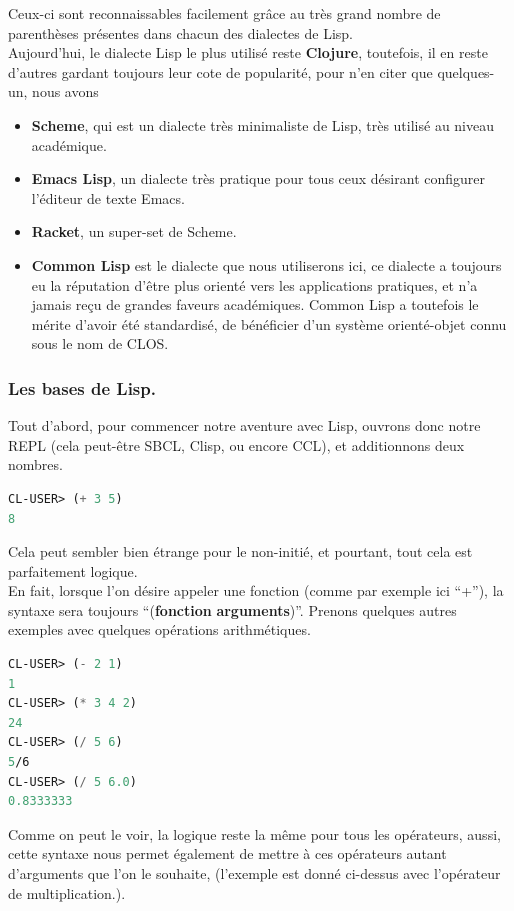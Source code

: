 \documentclass[a4paper, 12pt]{article}
\numberwithin{equation}{subsection}
\begin{document}
Ceux-ci sont reconnaissables facilement grâce au très grand nombre de parenthèses présentes dans chacun des dialectes de Lisp. \\

Aujourd'hui, le dialecte Lisp le plus utilisé reste {\bf Clojure}, toutefois, il en reste d'autres gardant toujours leur cote de popularité, pour n'en citer que quelques-un, nous avons
\begin{itemize}
  \item {\bf Scheme}, qui est un dialecte très minimaliste de Lisp, très utilisé au niveau académique.
  \item {\bf Emacs Lisp}, un dialecte très pratique pour tous ceux désirant configurer l'éditeur de texte Emacs.
  \item {\bf Racket}, un super-set de Scheme.
  \item {\bf Common Lisp} est le dialecte que nous utiliserons ici, ce dialecte a toujours eu la réputation d'être plus orienté vers les applications pratiques, et n'a jamais reçu de grandes faveurs académiques. Common Lisp a toutefois le mérite d'avoir été standardisé, de bénéficier d'un système orienté-objet connu sous le nom de CLOS.
\end{itemize}
\subsubsection{Les bases de Lisp.}
Tout d'abord, pour commencer notre aventure avec Lisp, ouvrons donc notre REPL (cela peut-être SBCL, Clisp, ou encore CCL), et additionnons deux nombres. \\
\begin{lstlisting}[language=Lisp]
CL-USER> (+ 3 5)
8
\end{lstlisting}
Cela peut sembler bien étrange pour le non-initié, et pourtant, tout cela est parfaitement logique. \\

En fait, lorsque l'on désire appeler une fonction (comme par exemple ici ``+''), la syntaxe sera toujours ``({\bf fonction} {\bf arguments})''. Prenons quelques autres exemples avec quelques opérations arithmétiques. \\
\begin{lstlisting}[language=Lisp]
CL-USER> (- 2 1)
1
CL-USER> (* 3 4 2)
24
CL-USER> (/ 5 6)
5/6
CL-USER> (/ 5 6.0)
0.8333333
\end{lstlisting}
Comme on peut le voir, la logique reste la même pour tous les opérateurs, aussi, cette syntaxe nous permet également de mettre à ces opérateurs autant d'arguments que l'on le souhaite, (l'exemple est donné ci-dessus avec l'opérateur de multiplication.). \\
\end{document}
